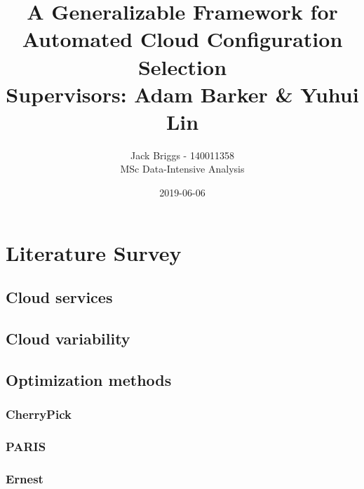 \documentclass{report}
\title{\vspace{-2.0cm} A Generalizable Framework for Automated Cloud Configuration Selection \\ \vspace{0.5cm} \large Supervisors: Adam Barker \& Yuhui Lin}
\date{2019-06-06}
\author{Jack Briggs - 140011358 \\ MSc Data-Intensive Analysis}
\begin{document}
\maketitle
\newpage
\chapter{Literature Survey}
\section{Cloud services}
\section{Cloud variability}
\section{Optimization methods}
\subsection{CherryPick}
\subsection{PARIS}
\subsection{Ernest}
\end{document}
